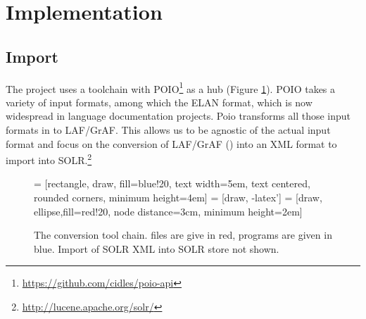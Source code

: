\documentclass[10pt, a4paper]{article}
\begin{document}

\section{Implementation}
\subsection{Import}
The project uses a toolchain with POIO\footnote{\url{https://github.com/cidles/poio-api}} as a hub (Figure \ref{fig:toolchain}). POIO takes a variety of input formats, among which  the ELAN format, which is now widespread in language documentation projects. Poio transforms all those input formats in to LAF/GrAF. This allows us to be agnostic of the actual input format and focus on the conversion of LAF/GrAF (\cite{IdeRomary2006,IdeSuderman2007}) into an XML format to import into SOLR.\footnote{\url{http://lucene.apache.org/solr/}} 

\begin{figure}[t]
 = [rectangle, draw, fill=blue!20, 
    text width=5em, text centered, rounded corners, minimum height=4em]
 = [draw, -latex']
 = [draw, ellipse,fill=red!20, node distance=3cm,
    minimum height=2em]
\caption{The conversion tool chain. files are give in red, programs are given in blue. Import of SOLR XML into SOLR store not shown.}
\label{fig:toolchain}
\end{figure}
\end{document}

